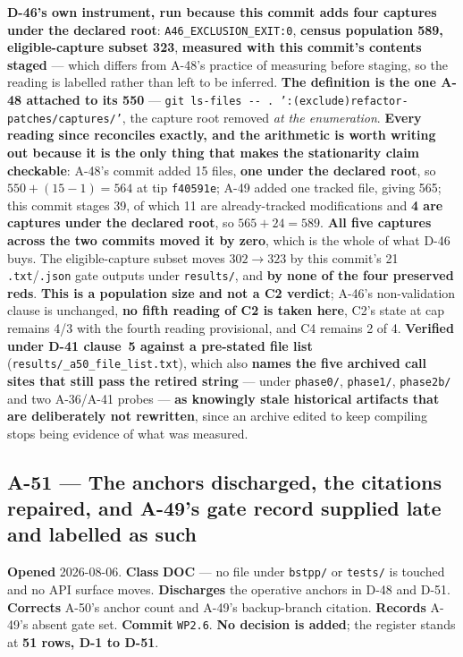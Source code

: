 \documentclass[
  10pt,
]{article}
\begin{document}
\textbf{D-46's own instrument, run because this commit adds four captures under the declared root}: \texttt{A46\_EXCLUSION\_EXIT:0}, \textbf{census population 589, eligible-capture subset 323}, \textbf{measured with this commit's contents staged} --- which differs from A-48's practice of measuring before staging, so the reading is labelled rather than left to be inferred. \textbf{The definition is the one A-48 attached to its 550} --- \texttt{git ls-files -{}- .\ ':(exclude)refactor-patches/captures/'}, the capture root removed \emph{at the enumeration}. \textbf{Every reading since reconciles exactly, and the arithmetic is worth writing out because it is the only thing that makes the stationarity claim checkable}: A-48's commit added 15 files, \textbf{one under the declared root}, so $550 + (15-1) = 564$ at tip \texttt{f40591e}; A-49 added one tracked file, giving 565; this commit stages 39, of which 11 are already-tracked modifications and \textbf{4 are captures under the declared root}, so $565 + 24 = 589$. \textbf{All five captures across the two commits moved it by zero}, which is the whole of what D-46 buys. The eligible-capture subset moves $302 \to 323$ by this commit's 21 \texttt{.txt}/\texttt{.json} gate outputs under \texttt{results/}, and \textbf{by none of the four preserved reds}. \textbf{This is a population size and not a C2 verdict}; A-46's non-validation clause is unchanged, \textbf{no fifth reading of C2 is taken here}, C2's state at cap remains 4/3 with the fourth reading provisional, and C4 remains 2 of 4. \textbf{Verified under D-41 clause~5 against a pre-stated file list} (\texttt{results/\allowbreak{}\_a50\_file\_list.txt}), which also \textbf{names the five archived call sites that still pass the retired string} --- under \texttt{phase0/}, \texttt{phase1/}, \texttt{phase2b/} and two A-36/A-41 probes --- \textbf{as knowingly stale historical artifacts that are deliberately not rewritten}, since an archive edited to keep compiling stops being evidence of what was measured.
\hypertarget{a-51}{%
\subsection{A-51 --- The anchors discharged, the citations repaired, and A-49's gate record supplied late and labelled as such}\label{a-51}}

\textbf{Opened} 2026-08-06. \textbf{Class} \textbf{DOC} --- no file under \texttt{bstpp/} or \texttt{tests/} is touched and no API surface moves. \textbf{Discharges} the operative anchors in D-48 and D-51. \textbf{Corrects} A-50's anchor count and A-49's backup-branch citation. \textbf{Records} A-49's absent gate set. \textbf{Commit} \texttt{WP2.6}. \textbf{No decision is added}; the register stands at \textbf{51 rows, D-1 to D-51}.
\end{document}
